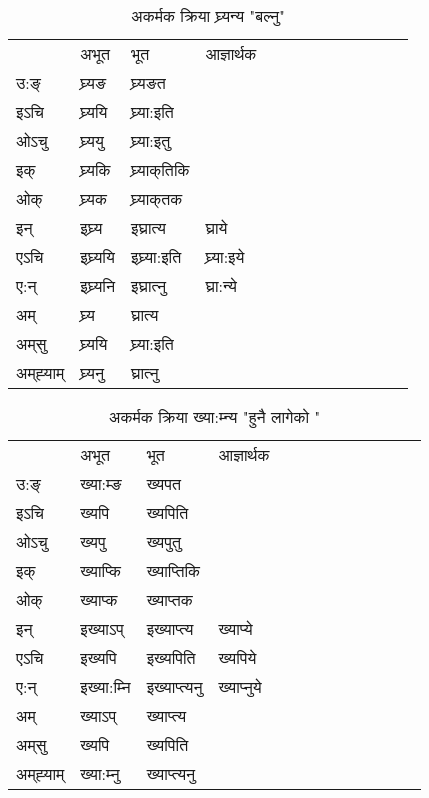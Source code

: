 

\begin{table}[H]
\centering
\caption{\label{ɛ.vi} अकर्मक क्रिया  घ्र्यन्य  "बल्नु"  }
\begin{tabular}{l|l|l|l|l|l|l|l|l|l|l|l|l}  \toprule
&अभूत & भूत & आज्ञार्थक \\ 
उ:ङ्‌ &घ्र्यङ &घ्र्यङत \\ 
इऽचि &घ्र्ययि &घ्र्या:इति   \\ 
ओऽचु &घ्र्ययु &घ्र्या:इतु   \\ 
इक् &घ्र्यकि &घ्र्याक्‌तिकि   \\ 
ओक् &घ्र्यक &घ्र्याक्‌तक   \\ 
इन् & इघ्र्य & इघ्रात्य &घ्राये  \\ 
एऽचि & इघ्र्ययि & इघ्र्या:इति &घ्र्या:इये    \\ 
ए:न् & इघ्र्यनि  & इघ्रात्‍नु &घ्रा:न्ये  \\ 
अम् & घ्र्य & घ्रात्य   \\ 
अम्‌सु & घ्र्ययि & घ्र्या:इति     \\ 
अम्‌ह्‍याम् & घ्र्यनु  & घ्रात्‍नु \\ 
\bottomrule
\end{tabular}
\end{table}


\begin{table}[H]
\centering
\caption{\label{ɛp.vi} अकर्मक क्रिया  ख्या:म्‍न्य  "हुनै लागेको "  }
\begin{tabular}{l|l|l|l|l|l|l|l|l|l|l|l|l}  \toprule
&अभूत & भूत & आज्ञार्थक \\ 
उ:ङ्‌ &ख्या:म्ङ &ख्यपत \\ 
इऽचि &ख्यपि &ख्यपिति   \\ 
ओऽचु &ख्यपु &ख्यपुतु   \\ 
इक् &ख्याप्कि &ख्याप्‍तिकि   \\ 
ओक् &ख्याप्क &ख्याप्‍तक   \\ 
इन् & इख्याऽप् & इख्याप्‍त्य &ख्याप्ये  \\ 
एऽचि & इख्यपि & इख्यपिति &ख्यपिये    \\ 
ए:न् & इख्या:म्‍नि  & इख्याप्‍त्यनु &ख्याप्‍नुये  \\ 
अम् & ख्याऽप् & ख्याप्‍त्य   \\ 
अम्‌सु & ख्यपि & ख्यपिति   \\ 
अम्‌ह्‍याम् & ख्या:म्‍नु  & ख्याप्‍त्यनु \\ 
\bottomrule
\end{tabular}
\end{table}


